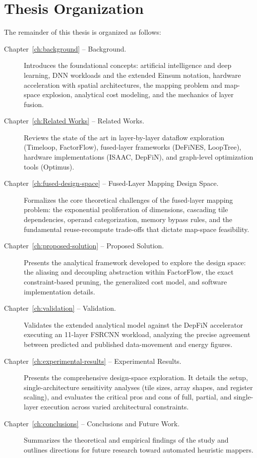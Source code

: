 \section{Thesis Organization}
\label{sec:intro-organisation}

The remainder of this thesis is organized as follows:

\begin{description}
  \item[Chapter~\ref{ch:background} -- Background.]
    Introduces the foundational concepts: artificial intelligence
    and deep learning, DNN workloads and the extended Einsum notation,
    hardware acceleration with spatial architectures, the mapping
    problem and map-space explosion, analytical cost modeling,
    and the mechanics of layer fusion.

  \item[Chapter~\ref{ch:Related Works} -- Related Works.]
    Reviews the state of the art in layer-by-layer dataflow
    exploration (Timeloop, FactorFlow), fused-layer frameworks
    (DeFiNES, LoopTree), hardware implementations (ISAAC, DepFiN),
    and graph-level optimization tools (Optimus).

  \item[Chapter~\ref{ch:fused-design-space} -- Fused-Layer Mapping Design Space.]
    Formalizes the core theoretical challenges of the fused-layer mapping problem:
    the exponential proliferation of dimensions, cascading tile dependencies,
    operand categorization, memory bypass rules, and the fundamental
    reuse-recompute trade-offs that dictate map-space feasibility.

  \item[Chapter~\ref{ch:proposed-solution} -- Proposed Solution.]
    Presents the analytical framework developed to explore the design space:
    the aliasing and decoupling abstraction within FactorFlow, the exact constraint-based
    pruning, the generalized cost model, and
    software implementation details.

  \item[Chapter~\ref{ch:validation} -- Validation.]
    Validates the extended analytical model against the DepFiN accelerator
    executing an 11-layer FSRCNN workload, analyzing the precise agreement
    between predicted and published data-movement and energy figures.

  \item[Chapter~\ref{ch:experimental-results} -- Experimental Results.]
    Presents the comprehensive design-space exploration. It details the setup,
    single-architecture sensitivity analyses (tile sizes, array shapes, and register scaling),
    and evaluates the critical pros and cons of full, partial, and single-layer execution
    across varied architectural constraints.

  \item[Chapter~\ref{ch:conclusions} -- Conclusions and Future Work.]
    Summarizes the theoretical and empirical findings of the study and
    outlines directions for future research toward automated heuristic mappers.
\end{description}